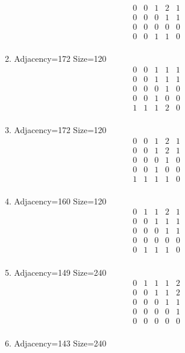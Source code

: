\documentclass[12pt]{article}
\begin{document}
\begin{multicols}{3}
\begin{enumerate}
\begin{equation*}
\begin{array}{ccccc}
0&0&1&2&1\\
0&0&0&1&1\\
0&0&0&0&0\\
0&0&1&1&0\\
\end{array}
\end{equation*}
\item Adjacency=172 Size=120
\begin{equation*}
\begin{array}{ccccc}
0&0&1&1&1\\
0&0&1&1&1\\
0&0&0&1&0\\
0&0&1&0&0\\
1&1&1&2&0\\
\end{array}
\end{equation*}
\item Adjacency=172 Size=120
\begin{equation*}
\begin{array}{ccccc}
0&0&1&2&1\\
0&0&1&2&1\\
0&0&0&1&0\\
0&0&1&0&0\\
1&1&1&1&0\\
\end{array}
\end{equation*}
\item Adjacency=160 Size=120
\begin{equation*}
\begin{array}{ccccc}
0&1&1&2&1\\
0&0&1&1&1\\
0&0&0&1&1\\
0&0&0&0&0\\
0&1&1&1&0\\
\end{array}
\end{equation*}
\item Adjacency=149 Size=240
\begin{equation*}
\begin{array}{ccccc}
0&1&1&1&2\\
0&0&1&1&2\\
0&0&0&1&1\\
0&0&0&0&1\\
0&0&0&0&0\\
\end{array}
\end{equation*}
\item Adjacency=143 Size=240

\end{enumerate}
\end{multicols}
\end{document}
